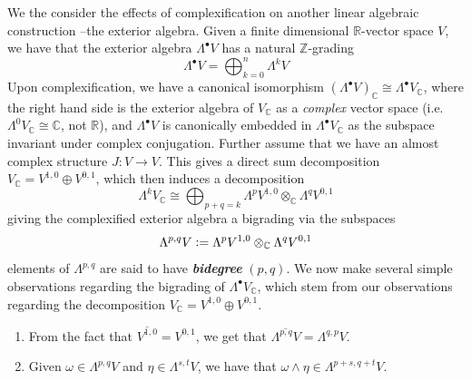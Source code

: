 \documentclass[psamsfonts, 12pt]{amsart}
\theoremstyle{definition}
\theoremstyle{remark}
\newcommand{\R}{\mathbb{R}}
\newcommand{\ib}[1]{\textbf{\textit{#1}}}
\newcommand{\Z}{\mathbb{Z}}
\newcommand{\C}{\mathbb{C}}
\newcommand{\defeq}{\vcentcolon=}
\begin{document}
We the consider the effects of complexification on another linear algebraic construction
--the exterior algebra. Given a finite dimensional $\R$-vector space $V$, we have that
the exterior algebra $\Lambda^\bullet V$ has a natural $\Z$-grading
\[
\Lambda^\bullet V = \bigoplus_{k = 0}^n \Lambda^kV
\]
Upon complexification, we have a canonical isomorphism
$(\Lambda^\bullet V)_\C \cong \Lambda^\bullet V_\C$, where the right hand side is the
exterior algebra of $V_\C$ as a \emph{complex} vector space
(i.e. $\Lambda^0 V_\C \cong \C$, not $\R$), and $\Lambda^\bullet V$ is canonically
embedded in $\Lambda^\bullet V_\C$ as the subspace invariant under complex conjugation.
Further assume that we have an almost complex structure $J : V \to V$. This gives a
direct sum decomposition $V_\C = V^{1,0} \oplus V^{0,1}$, which then induces a
decomposition
\[
\Lambda^kV_\C \cong \bigoplus_{p+q=k}\Lambda^pV^{1,0} \otimes_\C \Lambda^q V^{0,1}
\]
giving the complexified exterior algebra a bigrading via the subspaces
\[
\Lambda^{p,q}V \defeq \Lambda^p V^{1,0} \otimes_\C \Lambda^q V^{0,1}
\]
elements of $\Lambda^{p,q}$ are said to have \ib{bidegree} $(p,q)$. We now make several
simple observations regarding the bigrading of $\Lambda^\bullet V_\C$, which stem from
our observations regarding the decomposition $V_\C = V^{1,0} \oplus V^{0,1}$.
%
\begin{enumerate}
  \item From the fact that $\overline{V^{1,0}} = V^{0,1}$, we get that
  $\overline{\Lambda^{p,q}V} = \Lambda^{q,p}V$.
  \item Given $\omega \in \Lambda^{p,q}V$ and $\eta \in \Lambda^{s,t}V$, we have that
  $\omega \wedge \eta \in \Lambda^{p+s,q+t}V$.
\end{enumerate}
%
\end{document}
